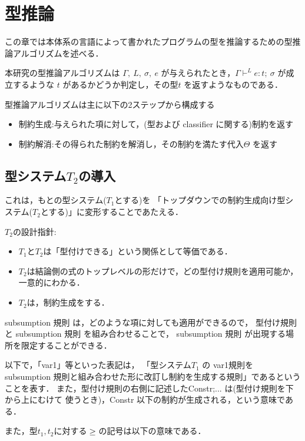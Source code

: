 \chapter{型推論}
この章では本体系の言語によって書かれたプログラムの型を推論するための型推論アルゴリズムを述べる．

本研究の型推論アルゴリズムは
$\Gamma,~ L,~ \sigma,~ e$ が与えられたとき，$\Gamma \vdash^{L} e : t ;~\sigma$ が成立するような $t$ があるかどうか判定し，その型$t$ を返すようなものである．

型推論アルゴリズムは主に以下の2ステップから構成する
\begin{itemize}
\item 制約生成:与えられた項に対して，(型および classifier に関する)制約を返す
\item 制約解消:その得られた制約を解消し，その制約を満たす代入$\Theta$ を返す
\end{itemize}

\section{型システム$T_2$の導入}
これは，もとの型システム($T_1$とする)を
「トップダウンでの制約生成向け型システム($T_2$とする)」に変形することであたえる．

$T_2$の設計指針:
\begin{itemize}
\item $T_1$と$T_2$は「型付けできる」という関係として等価である．
\item $T_2$は結論側の式のトップレベルの形だけで，どの型付け規則を適用可能か，一意的にわかる．
\item $T_2$は，制約生成をする．
\end{itemize}

subsumption 規則 は，どのような項に対しても適用ができるので，
型付け規則と subsumption 規則 を組み合わせることで，
subsumption 規則 が出現する場所を限定することができる．

以下で，「var1」等といった表記は，
「型システム$T_1$ の var1規則を subsumption 規則と組み合わせた形に改訂し制約を生成する規則」であるということを表す．
また，型付け規則の右側に記述したConstr;... は(型付け規則を下から上にむけて
使うとき)，Constr 以下の制約が生成される，という意味である．

また，型$t_1, t_2$に対する${} \ge {}$の記号は以下の意味である．

